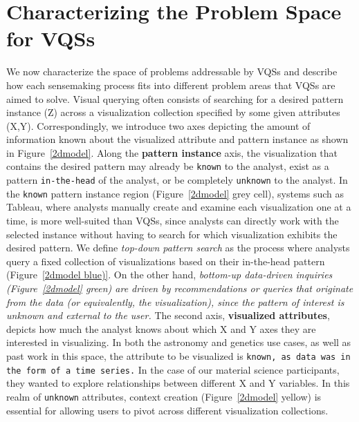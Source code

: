  \section{Characterizing the Problem Space for VQSs\label{appdx:problem_space}}
 We now characterize the space of problems addressable by VQSs and describe how each sensemaking process fits into different problem areas that VQSs are aimed to solve. Visual querying often consists of searching for a desired pattern instance (Z) across a visualization collection specified by some given attributes (X,Y). Correspondingly, we introduce two axes depicting the amount of information known about the visualized attribute and pattern instance as shown in Figure~\ref{2dmodel}.
 \npar Along the \textbf{pattern instance} axis, the visualization that contains the desired pattern may already be \texttt{known} to the analyst, exist as a pattern \texttt{in-the-head} of the analyst, or be completely \texttt{unknown} to the analyst. In the \texttt{known} pattern instance region (Figure~\ref{2dmodel} grey cell), systems such as Tableau, where analysts manually create and examine each visualization one at a time, is more well-suited than VQSs, since analysts can directly work with the selected instance without having to search for which visualization exhibits the desired pattern. We define \textit{top-down pattern search} as the process where analysts query a fixed collection of visualizations based on their in-the-head pattern (Figure~\ref{2dmodel blue)}. On the other hand, \textit{bottom-up data-driven inquiries (Figure~\ref{2dmodel} green) are driven by recommendations or queries that originate from the data (or equivalently, the visualization), since the pattern of interest is unknown and external to the user.}
 \npar The second axis, \textbf{visualized attributes},
 depicts how much the analyst
 knows about which X and Y axes
 they are interested in visualizing.
 In both the astronomy and genetics use cases,
 as well as past work in this space, the attribute to be visualized is \texttt{known, as data was in the form of a time series.} In the case of our material science participants, they wanted to explore relationships between different
 X and Y variables. In this realm of \texttt{unknown} attributes, context creation (Figure~\ref{2dmodel} yellow) is
 essential for allowing users to pivot across different visualization collections.
